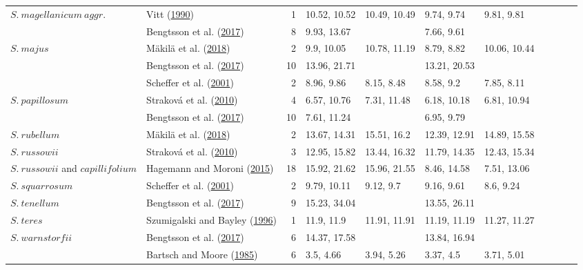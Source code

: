 \documentclass[
  12pt,
]{article}
\begin{document}
\begin{table}[H]
{\begin{tabular}[t]{llrllllllll}
\multirow[t]{-4}{*}{\raggedright\arraybackslash $S.~magellanicum~aggr.$} & Vitt (\protect\hyperlink{ref-Vitt.1990}{1990}) & 1 & 10.52, 10.52 & 10.49, 10.49 & 9.74, 9.74 & 9.81, 9.81 &  &  &  & \\
\cmidrule{1-11}
 & Bengtsson et al. (\protect\hyperlink{ref-Bengtsson.2017}{2017}) & 8 & 9.93, 13.67 &  & 7.66, 9.61 &  &  &  &  & \\

\multirow[t]{-2}{*}{\raggedright\arraybackslash $S.~majus$} & Mäkilä et al. (\protect\hyperlink{ref-Makila.2018}{2018}) & 2 & 9.9, 10.05 & 10.78, 11.19 & 8.79, 8.82 & 10.06, 10.44 &  &  &  & \\
\cmidrule{1-11}
 & Bengtsson et al. (\protect\hyperlink{ref-Bengtsson.2017}{2017}) & 10 & 13.96, 21.71 &  & 13.21, 20.53 &  &  &  &  & \\

 & Scheffer et al. (\protect\hyperlink{ref-Scheffer.2001}{2001}) & 2 & 8.96, 9.86 & 8.15, 8.48 & 8.58, 9.2 & 7.85, 8.11 &  &  &  & \\

\multirow[t]{-3}{*}{\raggedright\arraybackslash $S.~papillosum$} & Straková et al. (\protect\hyperlink{ref-Strakova.2010}{2010}) & 4 & 6.57, 10.76 & 7.31, 11.48 & 6.18, 10.18 & 6.81, 10.94 &  &  &  & \\
\cmidrule{1-11}
 & Bengtsson et al. (\protect\hyperlink{ref-Bengtsson.2017}{2017}) & 10 & 7.61, 11.24 &  & 6.95, 9.79 &  &  &  &  & \\

\multirow[t]{-2}{*}{\raggedright\arraybackslash $S.~rubellum$} & Mäkilä et al. (\protect\hyperlink{ref-Makila.2018}{2018}) & 2 & 13.67, 14.31 & 15.51, 16.2 & 12.39, 12.91 & 14.89, 15.58 &  &  &  & \\
\cmidrule{1-11}
$S.~russowii$ & Straková et al. (\protect\hyperlink{ref-Strakova.2010}{2010}) & 3 & 12.95, 15.82 & 13.44, 16.32 & 11.79, 14.35 & 12.43, 15.34 &  &  &  & \\
\cmidrule{1-11}
$S.~russowii$ and $capillifolium$ & Hagemann and Moroni (\protect\hyperlink{ref-Hagemann.2015}{2015}) & 18 & 15.92, 21.62 & 15.96, 21.55 & 8.46, 14.58 & 7.51, 13.06 &  &  &  & \\
\cmidrule{1-11}
$S.~squarrosum$ & Scheffer et al. (\protect\hyperlink{ref-Scheffer.2001}{2001}) & 2 & 9.79, 10.11 & 9.12, 9.7 & 9.16, 9.61 & 8.6, 9.24 &  &  &  & \\
\cmidrule{1-11}
$S.~tenellum$ & Bengtsson et al. (\protect\hyperlink{ref-Bengtsson.2017}{2017}) & 9 & 15.23, 34.04 &  & 13.55, 26.11 &  &  &  &  & \\
\cmidrule{1-11}
$S.~teres$ & Szumigalski and Bayley (\protect\hyperlink{ref-Szumigalski.1996}{1996}) & 1 & 11.9, 11.9 & 11.91, 11.91 & 11.19, 11.19 & 11.27, 11.27 &  &  &  & \\
\cmidrule{1-11}
$S.~warnstorfii$ & Bengtsson et al. (\protect\hyperlink{ref-Bengtsson.2017}{2017}) & 6 & 14.37, 17.58 &  & 13.84, 16.94 &  &  &  &  & \\
\cmidrule{1-11}
 & Bartsch and Moore (\protect\hyperlink{ref-Bartsch.1985}{1985}) & 6 & 3.5, 4.66 & 3.94, 5.26 & 3.37, 4.5 & 3.71, 5.01 &  &  &  & \\


\end{tabular}}
\end{table}
\end{document}
